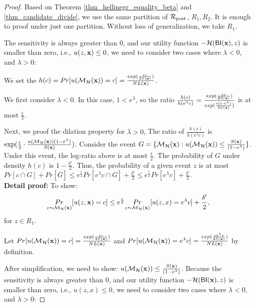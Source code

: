 \documentclass{article}
\begin{document}
\begin{proof}
Based on Theorem \ref{thm_hellinegr_equality_beta} and \ref{thm_candidate_divide}, we use the same partition of $\mathcal{R}_{\textup{post}}$, $R_1, R_2$. It is enough to proof under just one partition. Without loss of generalization, we take $R_1$.

The sensitivity is always greater than 0, and our utility function $-\mathcal{H}(\mathsf{BI}(\textbf{x}),z)$ is smaller than zero, i.e., $u(z,\textbf{x}) \leq 0$, we need to consider two cases where $\lambda < 0$, and $\lambda > 0$:

We set the $h(c) = Pr[u(\mathcal{M}_{\mathcal{H}}(\textbf{x})) = c] = \frac{exp(\frac{\epsilon c}{2 S(\textbf{x})})}{NL(\textbf{x})}$.

We first consider $\lambda < 0$. In this case, $1 < e ^ {\lambda}$, so the ratio $\frac{h(c)}{h(e^{\lambda}c)} = \frac{exp(\frac{\epsilon c}{2 S(\textbf{x})})}{exp(\frac{\epsilon (c \cdot e^{\lambda})}{2 S(\textbf{x})})}$ is at most $\frac{\epsilon}{2}$.

Next, we proof the dilation property for $\lambda > 0$, The ratio of $\frac{h(c)}{h(e^{\lambda}c)}$ is $\exp(\frac{\epsilon}{2} \cdot \frac{u(\mathcal{M}_{\mathcal{H}}(\textbf{x})) (1 - e^{\lambda})}{S(\textbf{x})})$. Consider the event $G = \{ \mathcal{M}_{\mathcal{H}}(\textbf{x}) : u(\mathcal{M}_{\mathcal{H}}(\textbf{x})) \leq \frac{S(\textbf{x})}{(1 - e^{\lambda})}\}$. Under this event, the log-ratio above is at most $\frac{\epsilon}{2}$. The probability of $G$ under density $h(c)$ is $1 - \frac{\delta'}{2}$. Thus, the probability of a given event $z$ is at most $Pr[c \cap G] + Pr[\overline{G}] \leq e^{\frac{\epsilon}{2}} Pr[e^{\lambda}c \cap G] + \frac{\delta'}{2} \leq e^{\frac{\epsilon}{2}} Pr[e^{\lambda}c] + \frac{\delta'}{2}$.\\


\textbf{Detail proof:}
	To show:
	\begin{equation*}
	\underset{z \thicksim \mathcal{M}_{\mathcal{H}}(\textbf{x})}{Pr}[u(z,\textbf{x}) = c]
	\leq
	e^{\frac{\epsilon}{2}} \underset{z \thicksim \mathcal{M}_{\mathcal{H}}(\textbf{x})}{Pr}[u(z,x) = e^{\lambda} c] + \frac{\delta'}{2},
	\end{equation*}
	for $z \in R_1$.

	Let $Pr[u(\mathcal{M}_{\mathcal{H}}(\textbf{x})) = c] = \frac{exp(\frac{\epsilon c}{2 S(\textbf{x})})}{NL(\textbf{x})}$ and $Pr[u(\mathcal{M}_{\mathcal{H}}(\textbf{x})) = e^{\lambda} c] = \frac{exp(\frac{\epsilon e^{\lambda} c}{2 S(\textbf{x})})}{NL(\textbf{x})}$ by definition.

	After simplification, we need to show: $u(\mathcal{M}_{\mathcal{H}}(\textbf{x})) \leq \frac{S(\textbf{x})}{(1 - e ^ {\lambda})}$.
	Because the sensitivity is always greater than 0, and our utility function $-\mathcal{H}(\mathsf{BI}(\textbf{x}),z)$ is smaller than zero, i.e., $u(z,x) \leq 0$, we need to consider two cases where $\lambda < 0$, and $\lambda > 0$:


\end{proof}
\end{document}
